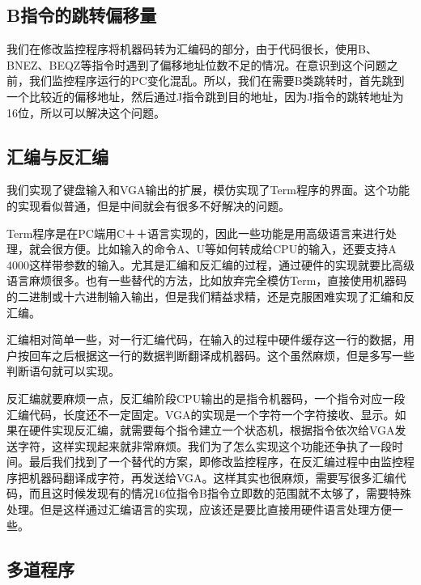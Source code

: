 \subsection{B指令的跳转偏移量}

我们在修改监控程序将机器码转为汇编码的部分，由于代码很长，使用B、BNEZ、BEQZ等指令时遇到了偏移地址位数不足的情况。在意识到这个问题之前，我们监控程序运行的PC变化混乱。所以，我们在需要B类跳转时，首先跳到一个比较近的偏移地址，然后通过J指令跳到目的地址，因为J指令的跳转地址为16位，所以可以解决这个问题。

\subsection{汇编与反汇编}

我们实现了键盘输入和VGA输出的扩展，模仿实现了Term程序的界面。这个功能的实现看似普通，但是中间就会有很多不好解决的问题。

Term程序是在PC端用C＋＋语言实现的，因此一些功能是用高级语言来进行处理，就会很方便。比如输入的命令A、U等如何转成给CPU的输入，还要支持A 4000这样带参数的输入。尤其是汇编和反汇编的过程，通过硬件的实现就要比高级语言麻烦很多。也有一些替代的方法，比如放弃完全模仿Term，直接使用机器码的二进制或十六进制输入输出，但是我们精益求精，还是克服困难实现了汇编和反汇编。

汇编相对简单一些，对一行汇编代码，在输入的过程中硬件缓存这一行的数据，用户按回车之后根据这一行的数据判断翻译成机器码。这个虽然麻烦，但是多写一些判断语句就可以实现。

反汇编就要麻烦一点，反汇编阶段CPU输出的是指令机器码，一个指令对应一段汇编代码，长度还不一定固定。VGA的实现是一个字符一个字符接收、显示。如果在硬件实现反汇编，就需要每个指令建立一个状态机，根据指令依次给VGA发送字符，这样实现起来就非常麻烦。我们为了怎么实现这个功能还争执了一段时间。最后我们找到了一个替代的方案，即修改监控程序，在反汇编过程中由监控程序把机器码翻译成字符，再发送给VGA。这样其实也很麻烦，需要写很多汇编代码，而且这时候发现有的情况16位指令B指令立即数的范围就不太够了，需要特殊处理。但是这样通过汇编语言的实现，应该还是要比直接用硬件语言处理方便一些。

\subsection{多道程序}

